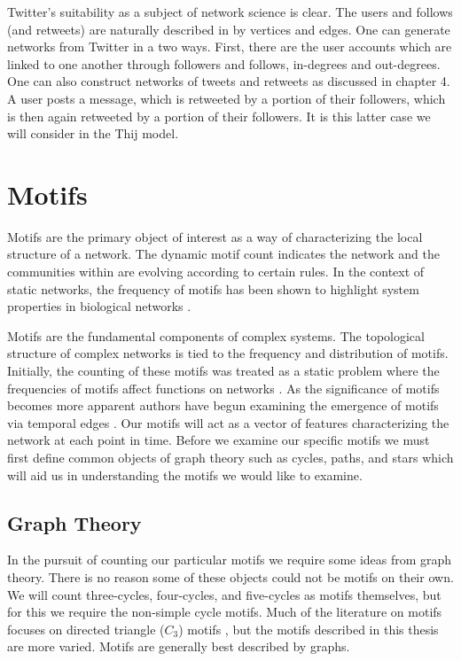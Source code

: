 Twitter's suitability as a subject of network science is clear. The users and follows (and retweets) are naturally 
described in by vertices and edges. One can generate networks from Twitter in a two ways.
 First, there are the user accounts which are linked to one another through 
followers and follows, in-degrees and out-degrees. One can also construct networks
of tweets and retweets as discussed in chapter 4. A user posts a message, which is  
retweeted by a portion of their followers, which is then again retweeted by a portion of their followers.
 It is this latter case we will consider in the Thij model.

\chapter{Motifs}
\label{section:Motifs}

Motifs are the primary object of interest as a way of characterizing the local structure of a
network. The dynamic motif count indicates the network and the communities within are evolving according to certain rules.
In the context of static networks, the frequency of motifs 
has been shown to highlight system properties in biological networks \cite{biomotif} \cite{bioAlbert}.

Motifs are the fundamental components of complex systems.
The topological structure of complex networks
is tied to the frequency and distribution of motifs. Initially, the counting of 
these motifs was treated as a static problem where the frequencies of motifs affect functions on networks \cite{motifdiscovery}.
As the significance of motifs becomes more apparent authors have begun examining the emergence of motifs 
via temporal edges \cite{temporalmotifs}. Our motifs will
act as a vector of features characterizing the network at each point in time. Before we
examine our specific motifs we must first define common objects of graph theory such as cycles, paths, and stars
which will aid us in understanding the motifs we would like to examine.

\section{Graph Theory}

In the pursuit of counting our particular motifs we require some
ideas from graph theory. There is no reason some of these objects could not be 
motifs on their own. We will count three-cycles, four-cycles, and five-cycles
as motifs themselves, but for this we require the non-simple cycle motifs.
Much of the literature on motifs focuses on directed triangle ($C_3$) motifs \cite{temporalmotifs} \cite{Milo824}, but 
 the motifs described in this thesis are more varied.
Motifs are generally best described by graphs. 

